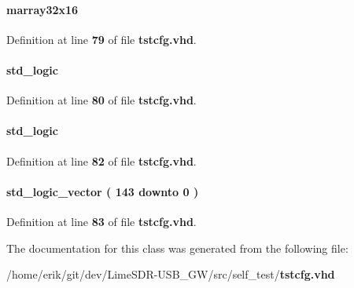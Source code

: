 \paragraph[{mem}]{ {\bfseries {\bfseries {\bf marray32x16}} \textcolor{vhdlchar}{ }} \hspace{0.3cm}{\ttfamily [Signal]}}\label{clasststcfg_1_1arch_a690a84258a10d3f5398d2664631b7d0a}


Definition at line {\bf 79} of file {\bf tstcfg.\+vhd}.

\paragraph[{mem\+\_\+we}]{ {\bfseries \textcolor{comment}{std\+\_\+logic}\textcolor{vhdlchar}{ }} \hspace{0.3cm}{\ttfamily [Signal]}}\label{clasststcfg_1_1arch_af8860104ed00694f8fd42b5866bdc214}


Definition at line {\bf 80} of file {\bf tstcfg.\+vhd}.

\paragraph[{oe}]{ {\bfseries \textcolor{comment}{std\+\_\+logic}\textcolor{vhdlchar}{ }} \hspace{0.3cm}{\ttfamily [Signal]}}\label{clasststcfg_1_1arch_a26b61972715b37edeac76d7a027100fe}


Definition at line {\bf 82} of file {\bf tstcfg.\+vhd}.

\paragraph[{spi\+\_\+config\+\_\+data\+\_\+rev}]{ {\bfseries \textcolor{comment}{std\+\_\+logic\+\_\+vector}\textcolor{vhdlchar}{ }\textcolor{vhdlchar}{(}\textcolor{vhdlchar}{ }\textcolor{vhdlchar}{ } \textcolor{vhdldigit}{143} \textcolor{vhdlchar}{ }\textcolor{keywordflow}{downto}\textcolor{vhdlchar}{ }\textcolor{vhdlchar}{ } \textcolor{vhdldigit}{0} \textcolor{vhdlchar}{ }\textcolor{vhdlchar}{)}\textcolor{vhdlchar}{ }} \hspace{0.3cm}{\ttfamily [Signal]}}\label{clasststcfg_1_1arch_aff1f2243afa099f0988a7ec41520f197}


Definition at line {\bf 83} of file {\bf tstcfg.\+vhd}.



The documentation for this class was generated from the following file\+:\begin{DoxyCompactItemize}
\item 
/home/erik/git/dev/\+Lime\+S\+D\+R-\/\+U\+S\+B\+\_\+\+G\+W/src/self\+\_\+test/{\bf tstcfg.\+vhd}\end{DoxyCompactItemize}
